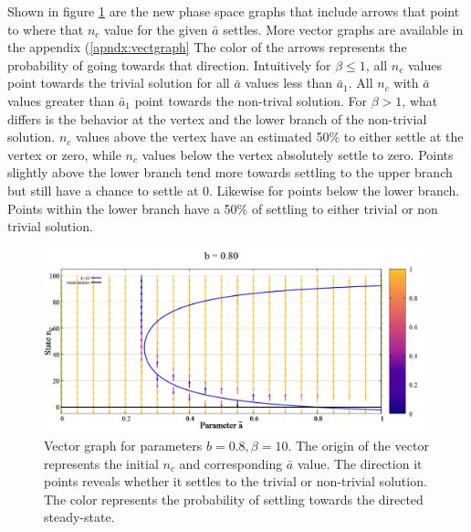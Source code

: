 Shown in figure \ref{fig:compareSingleSS} are the new phase space graphs that include arrows that point to where that $n_{c}$ value for the given $\bar{a}$ settles.
More vector graphs are available in the appendix (\ref{apndx:vectgraph}
The color of the arrows represents the probability of going towards that direction.
Intuitively for $\beta \leq 1$, all $n_{c}$ values point towards the trivial solution for all $\bar{a}$ values less than  $\bar{a}_{1}$. 
All $n_{c}$ with $\bar{a}$ values greater than $\bar{a}_{1}$ point towards the non-trival solution.
For $\beta > 1$, what differs is the behavior at the vertex and the lower branch of the non-trivial solution.
$n_{c}$ values above the vertex have an estimated 50\% to either settle at the vertex or zero, while $n_{c}$ values below the vertex absolutely settle to zero.
Points slightly above the lower branch tend more towards settling to the upper branch but still have a chance to settle at 0.
Likewise for points below the lower branch.
Points within the lower branch have a 50\% of settling to either trivial or non trivial solution.

\begin{figure}[h!]
 \centering
  \includegraphics[width=\linewidth]{images/appendix/vectors/4.png}
  \caption{Vector graph for parameters $b = 0.8, \beta = 10$. The origin of the vector represents the initial $n_{c}$ and corresponding $\bar{a}$ value. The direction it points reveals whether it settles to the trivial or non-trivial solution. The color represents the probability of settling towards the directed steady-state.}
  \label{fig:compareSingleSS}
\end{figure}



